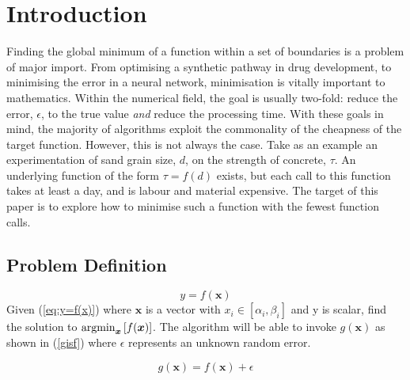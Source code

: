 
\chapter{Introduction}  %

\ifpdf
    \graphicspath{{Chapter1/Figs/Raster/}{Chapter1/Figs/PDF/}{Chapter1/Figs/}}
\else
    \graphicspath{{Chapter1/Figs/Vector/}{Chapter1/Figs/}}
\fi

Finding the global minimum of a function within a set of boundaries is a problem of major import. From optimising a synthetic pathway in drug development, to minimising the error in a neural network, minimisation is vitally important to mathematics. Within the numerical field, the goal is usually two-fold: reduce the error, $\epsilon$, to the true value \textit{and} reduce the processing time. With these goals in mind, the majority of algorithms exploit the commonality of the cheapness of the target function. However, this is not always the case. Take as an example an experimentation of sand grain size, $d$, on the strength of concrete, $\tau$. An underlying function of the form $\tau=f(d)$ exists, but each call to this function takes at least a day, and is labour and material expensive. The target of this paper is to explore how to minimise such a function with the fewest function calls.
 
\section{Problem Definition}
\begin{equation}
    \label{eq:y=f(x)}
    y=f(\bm{x})
\end{equation}
Given (\ref{eq:y=f(x)}) where $\bm{x}$ is a vector with $x_i\in[\alpha_i, \beta_i]$ and y is scalar, find the solution to $\operatorname*{argmin}_{\bm{x}}{[f(\bm{x})]}$. The algorithm will be able to invoke $g(\bm{x})$ as shown in (\ref{gisf}) where $\epsilon$ represents an unknown random error.

\begin{equation}
    \label{gisf}
    g(\bm{x}) = f(\bm{x}) + \epsilon
\end{equation}

